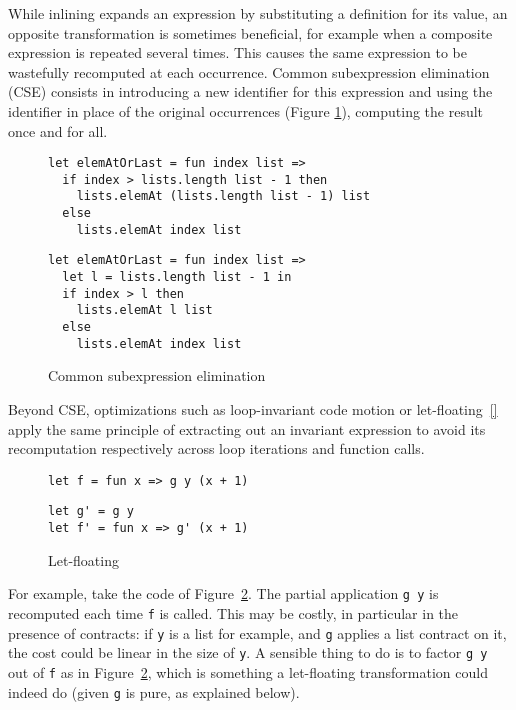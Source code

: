 \documentclass[sigplan,10pt,review,anonymous]{acmart}
\begin{document}
While inlining expands an expression by substituting a definition for its value,
an opposite transformation is sometimes beneficial, for example when a composite
expression is repeated several times. This causes the same expression to be
wastefully recomputed at each occurrence. Common subexpression elimination (CSE)
consists in introducing a new identifier for this expression and using the
identifier in place of the original occurrences
(Figure \ref{fig:optimizations-cse-ex}), computing the result once and for all.

\begin{figure}[h]
  \begin{center}
\begin{lstlisting}[language=nickel,title={Source program}]
let elemAtOrLast = fun index list =>
  if index > lists.length list - 1 then
    lists.elemAt (lists.length list - 1) list
  else
    lists.elemAt index list
\end{lstlisting}
\begin{lstlisting}[language=nickel,title={Optimized program}]
let elemAtOrLast = fun index list =>
  let l = lists.length list - 1 in
  if index > l then
    lists.elemAt l list
  else
    lists.elemAt index list
\end{lstlisting}
  \end{center}
\caption{Common subexpression elimination}
\label{fig:optimizations-cse-ex}
\end{figure}

Beyond CSE, optimizations such as loop-invariant code motion or
let-floating~\ref{} apply the same principle of extracting out an invariant
expression to avoid its recomputation respectively across loop iterations and
function calls.

\begin{figure}
  \begin{center}
\begin{lstlisting}[language=nickel,title={Source program}]
let f = fun x => g y (x + 1)
\end{lstlisting}
\begin{lstlisting}[language=nickel,title={Optimized program}]
let g' = g y
let f' = fun x => g' (x + 1)
\end{lstlisting}
  \end{center}
\caption{Let-floating}
\label{fig:optimizations-let-floating-ex}
\end{figure}

For example, take the code of Figure~\ref{fig:optimizations-let-floating-ex}.
The partial application \lstinline+g y+ is recomputed each time \lstinline+f+ is
called. This may be costly, in particular in the presence of contracts: if
\lstinline+y+ is a list for example, and \lstinline+g+ applies a list contract
on it, the cost could be linear in the size of \lstinline+y+. A sensible thing
to do is to factor \lstinline+g y+ out of \lstinline+f+ as in
Figure~\ref{fig:optimizations-let-floating-ex}, which is something a
let-floating transformation could indeed do (given \lstinline+g+ is pure, as
explained below).
\end{document}

